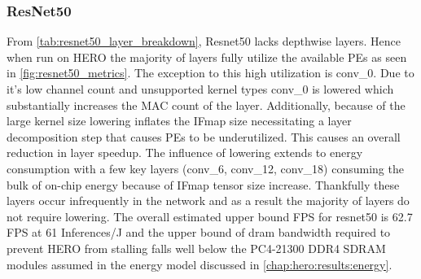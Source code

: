 \subsubsection{ResNet50}

From \autoref{tab:resnet50_layer_breakdown}, Resnet50 lacks depthwise layers.
Hence when run on HERO the majority of layers fully utilize the available PEs as
seen in \autoref{fig:resnet50_metrics}. The exception to
this high utilization is conv\_0. Due to it's low channel count and unsupported
kernel types conv\_0 is lowered which substantially increases the MAC count of
the layer. Additionally, because of the large kernel size lowering inflates the
IFmap size necessitating a layer decomposition step that causes PEs to be
underutilized. This causes an overall reduction in layer speedup. The influence
of lowering extends to energy consumption with a few key layers (conv\_6,
conv\_12, conv\_18) consuming the bulk of on-chip energy because of IFmap tensor
size increase. Thankfully these layers occur infrequently in the network and as
a result the majority of layers do not require lowering. The overall estimated
upper bound FPS for resnet50 is 62.7 FPS at 61 Inferences/J and the upper bound of
dram bandwidth required to prevent HERO from stalling falls well below the
PC4-21300 DDR4 SDRAM modules assumed in the energy model discussed in
\autoref{chap:hero:results:energy}. 

